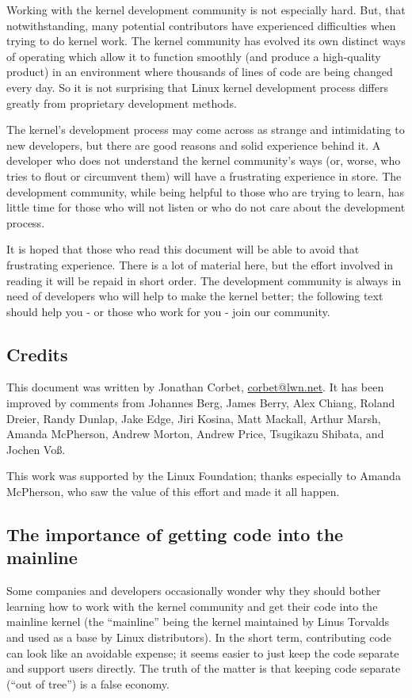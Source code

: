 \documentclass[a4paper,8pt,english]{sphinxmanual}
\begin{document}
Working with the kernel development community is not especially hard.  But,
that notwithstanding, many potential contributors have experienced
difficulties when trying to do kernel work.  The kernel community has
evolved its own distinct ways of operating which allow it to function
smoothly (and produce a high-quality product) in an environment where
thousands of lines of code are being changed every day.  So it is not
surprising that Linux kernel development process differs greatly from
proprietary development methods.

The kernel's development process may come across as strange and
intimidating to new developers, but there are good reasons and solid
experience behind it.  A developer who does not understand the kernel
community's ways (or, worse, who tries to flout or circumvent them) will
have a frustrating experience in store.  The development community, while
being helpful to those who are trying to learn, has little time for those
who will not listen or who do not care about the development process.

It is hoped that those who read this document will be able to avoid that
frustrating experience.  There is a lot of material here, but the effort
involved in reading it will be repaid in short order.  The development
community is always in need of developers who will help to make the kernel
better; the following text should help you - or those who work for you -
join our community.


\subsection{Credits}
\label{process/1.Intro:credits}
This document was written by Jonathan Corbet, \href{mailto:corbet@lwn.net}{corbet@lwn.net}.  It has been
improved by comments from Johannes Berg, James Berry, Alex Chiang, Roland
Dreier, Randy Dunlap, Jake Edge, Jiri Kosina, Matt Mackall, Arthur Marsh,
Amanda McPherson, Andrew Morton, Andrew Price, Tsugikazu Shibata, and
Jochen Voß.

This work was supported by the Linux Foundation; thanks especially to
Amanda McPherson, who saw the value of this effort and made it all happen.


\subsection{The importance of getting code into the mainline}
\label{process/1.Intro:the-importance-of-getting-code-into-the-mainline}
Some companies and developers occasionally wonder why they should bother
learning how to work with the kernel community and get their code into the
mainline kernel (the ``mainline'' being the kernel maintained by Linus
Torvalds and used as a base by Linux distributors).  In the short term,
contributing code can look like an avoidable expense; it seems easier to
just keep the code separate and support users directly.  The truth of the
matter is that keeping code separate (``out of tree'') is a false economy.
\end{document}
